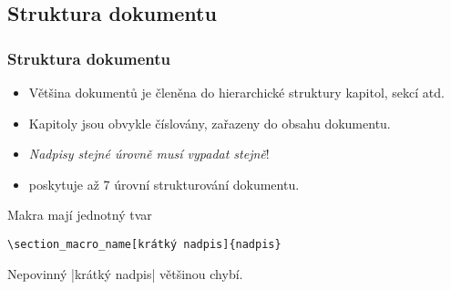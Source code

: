 \subsection{Struktura dokumentu}
\begin{frame}[fragile]
	\frametitle{Struktura dokumentu}
	\begin{itemize}
		\item Většina dokumentů je členěna do hierarchické struktury kapitol, sekcí atd.
		\item Kapitoly jsou obvykle číslovány, zařazeny do obsahu dokumentu.
		\item \emph{Nadpisy stejné úrovně musí vypadat stejně}!
		\item {} poskytuje až 7 úrovní strukturování dokumentu.
	\end{itemize}
	Makra mají jednotný tvar
	\begin{Verbatim}
\section_macro_name[krátký nadpis]{nadpis}
	\end{Verbatim}
	Nepovinný |krátký nadpis| většinou chybí.
\end{frame}

